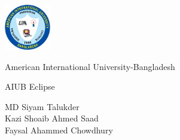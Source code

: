 \begin{titlepage}
\centering
\vspace*{\fill}  %

\includegraphics[width=0.15\textwidth]{images/aiub-logo.png} 
\vspace{0.5cm}  %

{\Huge American International University-Bangladesh \par}
\vspace{1cm}  %

{\Huge AIUB Eclipse \par}
\vspace{1cm}  %

{\Large
MD Siyam Talukder \\
Kazi Shoaib Ahmed Saad \\
Faysal Ahammed Chowdhury \par
}

\vspace*{\fill}  %


\end{titlepage}
